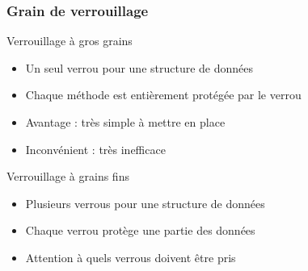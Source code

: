 
\begingroup

\begin{frame}
  \frametitle{Grain de verrouillage}

  \vfill
  \begin{block}{Verrouillage à gros grains}
    \begin{itemize}
    \item Un seul verrou pour une structure de données
    \item Chaque méthode est entièrement protégée par le verrou
    \item Avantage : très simple à mettre en place
    \item Inconvénient : très inefficace
    \end{itemize}
  \end{block}

  \vfill
  \begin{block}{Verrouillage à grains fins}
    \begin{itemize}
    \item Plusieurs verrous pour une structure de données
    \item Chaque verrou protège une partie des données
    \item Attention à quels verrous doivent être pris
    \end{itemize}
  \end{block}
  \vfill

\end{frame}

\endgroup
\endinput
